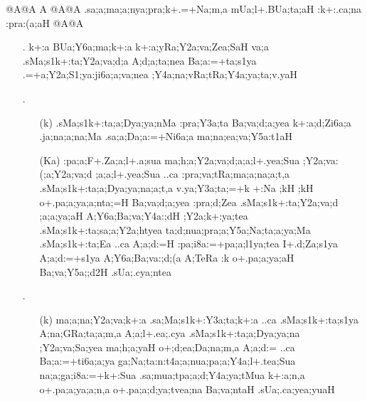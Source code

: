 \begin{spacing}{1.15}
{\sktf {}@A@A A @A@A .sa;a;ma;a;nya;pra;k+.=+Na;m,a
\ZF{-} mUa;l+.BUa;ta;aH :k+:.ca;na
:pra:(a;aH @A@A}

\begin{itemize}
  \item[{\sktf 1}.] {\sktf k+:a BUa;Y6a;ma;k+:a k+:a;yRa;Y2a;va;Zea;SaH
va;a .sMa;s1k+:ta;Y2a;va;d;a A;d;a;ta;nea
Ba;a:=+ta;s1ya .=+a;Y2a;S1;ya:ji6a;a;va;nea
;Y4a;na;vRa;tRa;Y4a;ya;ta;v.yaH }  
  
  \item[{\sktf 2}.] \begin{itemize} 
    \item[({\sktf k})] {\sktf .sMa;s1k+:ta;a;Dya;ya;nMa
:pra;Y3a;ta Ba;va;d;a;yea k+:a;d;Zi6a;a .ja;na;a;na;Ma .sa;a;Da;a:=+Ni6a;a
ma;na;ea;va;Y5a:t1aH }
                        
    \item[({\sktf Ka})] {\sktf :pa;a;F+.Za;a;l+.a;sua\ZF{,}
ma;h;a;Y2a;va;d;a;a;l+.yea;Sua\ZF{,} ;Y2a;va:(;a;Y2a;va;d%
;a;a;l+.yea;Sua ..ca :pra;va;tRa;ma;a;na;a;t,a
.sMa;s1k+:ta;a;Dya;ya;na;a;t,a v.ya;Y3a;ta;=+k%
+:Na\ZF{,} ;kH ;kH
o+.pa;a;ya;a;nta;=H Ba;va;d;a;yea
:pra;d;Zea .sMa;s1k+:ta;Y2a;va;d%
;a;a;ya;aH A;Y6a;Ba;va;Y4a:;dH
;Y2a;k+:ya;tea\ZF{,} .sMa;s1k+:ta;sa;a;Y2a;htyea ta;d;nua;pra;a;Y5a;Na;ta;a;ya;Ma .sMa;s1k+:ta;Ea ..ca
A;a;d:=H :pa;i8a:=+pa;a;l1ya;tea 
I+.d;Za;s1ya A;a;d:=+s1ya
A;Y6a;Ba;va:;d;(a A;TeRa
:k o+.pa;a;ya;aH Ba;va;Y5a;;d2H
.sUa;.cya;ntea }
     \end{itemize}
                       
 \item[{\sktf 3}.] \begin{itemize}
      \item[({\sktf k})] {\sktf ma;a;na;Y2a;va;k+:a
.sa;Ma;s1k+:Y3a;ta;k+:a ..ca
.sMa;s1k+:ta;s1ya A;na;GRa;ta;a;m,a A;a;l+.ea;.cya\ZF{,}
.sMa;s1k+:ta;a;Dya;ya;na ;Y2a;va;Sa;yea
ma;h;a;yaH o+;d;ea;Da;na;m,a A;a;d:=
..ca Ba;a:=+ti6a;a;ya ga;Na;ta:n:t4a;a;nua;pa;a;Y4a;l+.tea;Sua
na;a;ga;i8a:=+k+:Sua .sa;mua;tpa;a;d;Y4a;ya;tMua k+:a;n,a
o+.pa;a;ya;a;n,a o+.pa;a;d;ya;tvea;na Ba;va;ntaH .sUa;.ca;yea;yuaH}
                      

\end{itemize}
\end{itemize}
\end{spacing}
